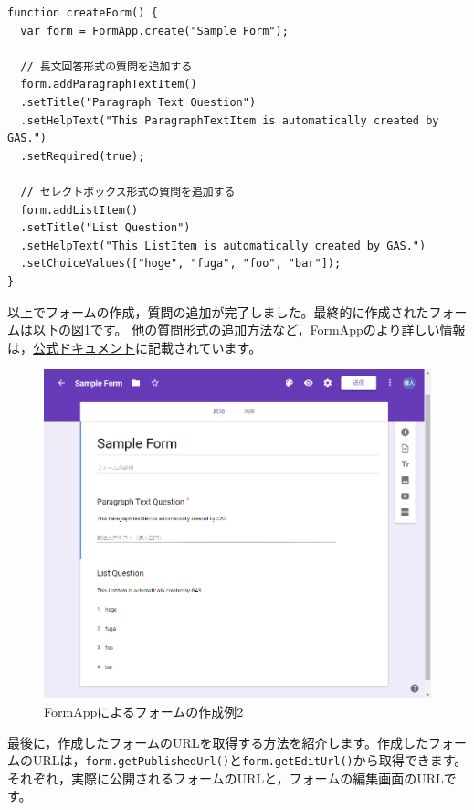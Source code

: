 \documentclass[uplatex,a4j]{jsarticle}
\begin{document}
\begin{lstlisting}[basicstyle=\ttfamily\footnotesize,frame=single,caption=FormApp sample 5]
function createForm() {
  var form = FormApp.create("Sample Form");
  
  // 長文回答形式の質問を追加する
  form.addParagraphTextItem()
  .setTitle("Paragraph Text Question")
  .setHelpText("This ParagraphTextItem is automatically created by GAS.")
  .setRequired(true);
  
  // セレクトボックス形式の質問を追加する
  form.addListItem()
  .setTitle("List Question")
  .setHelpText("This ListItem is automatically created by GAS.")
  .setChoiceValues(["hoge", "fuga", "foo", "bar"]);
}
\end{lstlisting}

以上でフォームの作成，質問の追加が完了しました。最終的に作成されたフォームは以下の図\ref{fig:form_sample3}です。
他の質問形式の追加方法など，FormAppのより詳しい情報は，\href{https://developers.google.com/apps-script/reference/forms}{公式ドキュメント}に記載されています。

\begin{figure}[H]
 \centering
 \includegraphics[keepaspectratio, scale=0.5]{images/form_sample3.png}
 \caption{FormAppによるフォームの作成例2}
 \label{fig:form_sample3}
\end{figure}

最後に，作成したフォームのURLを取得する方法を紹介します。作成したフォームのURLは，\verb|form.getPublishedUrl()|と\verb|form.getEditUrl()|から取得できます。それぞれ，実際に公開されるフォームのURLと，フォームの編集画面のURLです。
\end{document}

